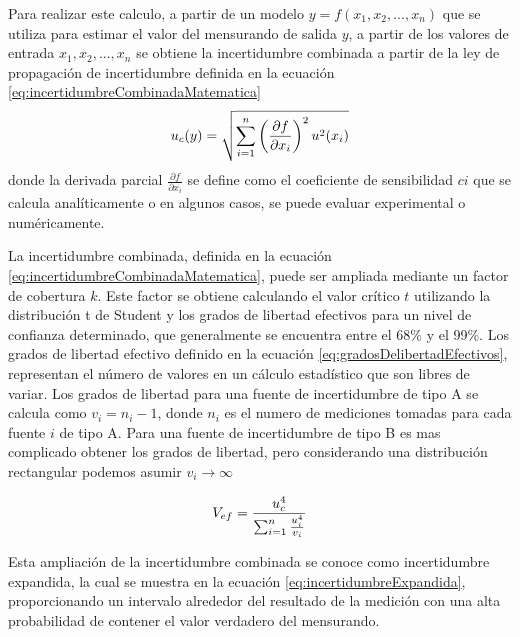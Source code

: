 Para realizar este calculo, a partir de un modelo $y = f(x_{1},x_{2}, ..., x_{n})$ que se utiliza para estimar el valor del mensurando de salida $y$, a partir de los valores de entrada $x_{1},x_{2}, ..., x_{n}$ se obtiene la incertidumbre combinada a partir de la ley de propagación de incertidumbre definida en la ecuación \ref{eq:incertidumbreCombinadaMatematica}
\begin{equation}
    \centering
    u_{c}(y) = \sqrt{\sum_{i=1}^{n} \left( \frac{\partial f}{\partial x_{i}} \right)^2 u^2(x_i)}
    \label{eq:incertidumbreCombinadaMatematica}
\end{equation}
donde la derivada parcial $\frac{\partial f}{\partial x_{i}}$ se define como el coeficiente de sensibilidad $c{i}$ que se calcula analíticamente o en algunos casos, se puede evaluar experimental o numéricamente.

La incertidumbre combinada, definida en la ecuación \ref{eq:incertidumbreCombinadaMatematica}, puede ser ampliada mediante un factor de cobertura $k$. Este factor se obtiene calculando el valor crítico $t$ utilizando la distribución t de Student y los grados de libertad efectivos para un nivel de confianza determinado, que generalmente se encuentra entre el 68\% y el 99\%. Los grados de libertad efectivo definido en la ecuación \ref{eq:gradosDelibertadEfectivos}, representan el número de valores en un cálculo estadístico que son libres de variar. Los grados de libertad para una fuente de incertidumbre de tipo A se calcula como  $v_{i}= n_{i}-1$, donde $n_{i}$ es el numero de mediciones tomadas para cada fuente $i$ de tipo A. Para una fuente de incertidumbre de tipo B es mas complicado obtener los grados de libertad, pero considerando una distribución rectangular podemos asumir $v_{i} \rightarrow \infty$


\begin{equation}
    \centering
    V_{ef} = \frac{u_c^4}{\sum_{i=1}^{n} \frac{u_i^4}{v_i}}
    \label{eq:gradosDelibertadEfectivos}
\end{equation}


Esta ampliación de la incertidumbre combinada se conoce como incertidumbre expandida, la cual se muestra en la ecuación \ref{eq:incertidumbreExpandida}, proporcionando un intervalo alrededor del resultado de la medición con una alta probabilidad de contener el valor verdadero del mensurando.


